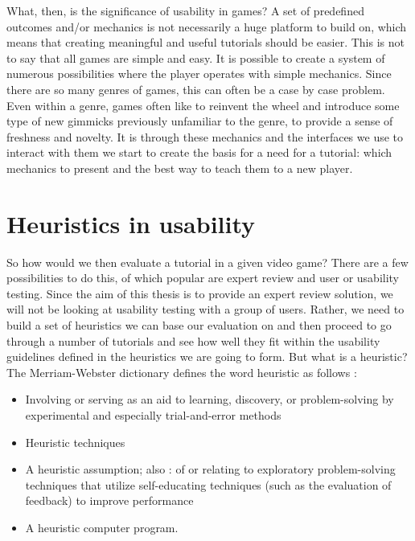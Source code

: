 What, then, is the significance of usability in games? A set of predefined outcomes and/or mechanics is not necessarily a huge platform to build on, which means that creating meaningful and useful tutorials should be easier. This is not to say that all games are simple and easy. It is possible to create a system of numerous possibilities where the player operates with simple mechanics. Since there are so many genres of games, this can often be a case by case problem. Even within a genre, games often like to reinvent the wheel and introduce some type of new gimmicks previously unfamiliar to the genre, to provide a sense of freshness and novelty. It is through these mechanics and the interfaces we use to interact with them we start to create the basis for a need for a tutorial: which mechanics to present and the best way to teach them to a new player.

\section{Heuristics in usability}

So how would we then evaluate a tutorial in a given video game? There are a few possibilities to do this, of which popular are expert review and user or usability testing. Since the aim of this thesis is to provide an expert review solution, we will not be looking at usability testing with a group of users. Rather, we need to build a set of heuristics we can base our evaluation on and then proceed to go through a number of tutorials and see how well they fit within the usability guidelines defined in the heuristics we are going to form. But what is a heuristic? The Merriam-Webster dictionary defines the word heuristic as follows \cite{merriam2007}: 

\begin{itemize}
	\item Involving or serving as an aid to learning, discovery, or problem-solving by experimental and especially trial-and-error methods 
	\item Heuristic techniques 
	\item A heuristic assumption; also :  of or relating to exploratory problem-solving techniques that utilize self-educating techniques (such as the evaluation of feedback) to improve performance 
	\item A heuristic computer program. 
	
\end{itemize}

